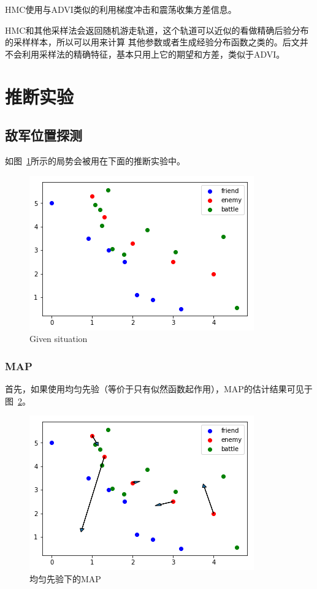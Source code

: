 \documentclass{article}
\begin{document}
HMC使用与ADVI类似的利用梯度冲击和震荡收集方差信息。

HMC和其他采样法会返回随机游走轨道，这个轨道可以近似的看做精确后验分布的采样样本，所以可以用来计算
其他参数或者生成经验分布函数之类的。后文并不会利用采样法的精确特征，基本只用上它的期望和方差，类似于ADVI。

\section{推断实验}

\subsection{敌军位置探测}


如图~\ref{fig:expState}所示的局势会被用在下面的推断实验中。

\begin{figure}[ht]
\includegraphics[width=0.6\linewidth]{exp_state.png}
\caption{Given situation}
\label{fig:expState}
\end{figure}


\subsubsection{MAP}


首先，如果使用均匀先验（等价于只有似然函数起作用），MAP的估计结果可见于图~\ref{fig:MAPone}。

\begin{figure}[ht]
\includegraphics[width=0.6\linewidth]{MAP1.png}
\caption{均匀先验下的MAP}
\label{fig:MAPone}
\end{figure}
\end{document}
